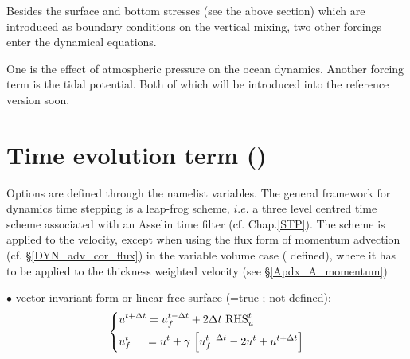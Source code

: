 Besides the surface and bottom stresses (see the above section) which are 
introduced as boundary conditions on the vertical mixing, two other forcings 
enter the dynamical equations. 

One is the effect of atmospheric pressure on the ocean dynamics.
Another forcing term is the tidal potential.
Both of which will be introduced into the reference version soon. 


\section  [Time evolution term (\textit{dynnxt})]
		{Time evolution term ()}
\label{DYN_nxt}


Options are defined through the  namelist variables.
The general framework for dynamics time stepping is a leap-frog scheme, 
$i.e.$ a three level centred time scheme associated with an Asselin time filter 
(cf. Chap.\ref{STP}). The scheme is applied to the velocity, except when using 
the flux form of momentum advection (cf. \S\ref{DYN_adv_cor_flux}) in the variable 
volume case ( defined), where it has to be applied to the thickness 
weighted velocity (see \S\ref{Apdx_A_momentum})  

$\bullet$ vector invariant form or linear free surface (=true ;  not defined):
\begin{equation} \label{Eq_dynnxt_vec}
\left\{   \begin{aligned}
&u^{t+\Delta t} = u_f^{t-\Delta t} + 2\Delta t  \ \text{RHS}_u^t  	\\
&u_f^t \;\quad = u^t+\gamma \,\left[ {u_f^{t-\Delta t} -2u^t+u^{t+\Delta t}} \right]
\end{aligned}   \right.
\end{equation} 

